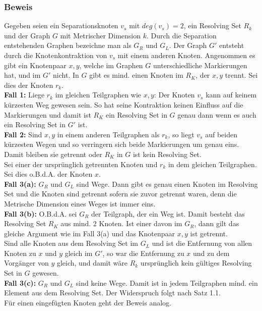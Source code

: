 \documentclass{article}
\begin{document}
\subsubsection{Beweis}
Gegeben seien ein Separationsknoten $v_s$ mit $deg(v_s)=2$, ein Resolving Set $R_k$ und der Graph $G$ mit Metrischer Dimension $k$. Durch die Separation entstehenden Graphen bezeichne man als $G_R$ und $G_L$. Der Graph $G'$ entsteht durch die Knotenkontraktion von $v_s$ mit einem anderen Knoten. Angenommen es gibt ein Knotenpaar $x,y$, welche im Graphen $G$ unterschiedliche Markierungen hat, und im $G'$ nicht. In $G$ gibt es mind. einen Knoten im $R_K$, der $x,y$ trennt. Sei dies der Knoten $r_k$.\\
\textbf{Fall 1:} Liege $r_k$ im gleichen Teilgraphen wie $x,y$: Der Knoten $v_s$ kann auf keinem kürzesten Weg gewesen sein. So hat seine Kontraktion keinen Einfluss auf die Markierungen und damit ist $R_K$ ein Resolving Set in $G$ genau dann wenn es auch ein Resolving Set in $G'$ ist.\\
\textbf{Fall 2:} Sind $x,y$ in einem anderen Teilgraphen als $r_k$, so liegt $v_s$ auf beiden kürzesten Wegen und so verringern sich beide Markierungen um genau eins. Damit bleiben sie getrennt oder $R_K$ in $G$ ist kein Resolving Set.\\
Sei einer der ursprünglich getrennten Knoten und $r_k$ in dem gleichen Teilgraphen. Sei dies o.B.d.A. der Knoten $x$.\\
\textbf{Fall 3(a):} $G_R$ und $G_L$ sind Wege. Dann gibt es genau einen Knoten im Resolving Set und die Knoten sind getrennt sofern sie zuvor getrennt waren, denn die Metrische Dimension eines Weges ist immer eins.\\
\textbf{Fall 3(b):} O.B.d.A. sei $G_R$ der Teilgraph, der ein Weg ist. Damit besteht das Resolving Set $R_K$ aus mind. 2 Knoten. Ist einer davon im $G_R$, dann gilt das gleiche Argument wie im Fall 3(a) und das Knotenpaar $x,y$ ist getrennt.\\Sind alle Knoten aus dem Resolving Set im $G_L$ und ist die Entfernung von allen Knoten zu $x$ und $y$ gleich im $G'$, so war die Entfernung zu $x$ und zu dem Vorgänger von $y$ gleich, und damit wäre $R_k$ ursprünglich kein gültiges Resolving Set in $G$ gewesen.\\
\textbf{Fall 3(c):} $G_R$ und $G_L$ sind keine Wege. Damit ist in jedem Teilgraphen mind. ein Element aus dem Resolving Set. Der Widerspruch folgt nach Satz 1.1.\\
Für einen eingefügten Knoten geht der Beweis analog.
\end{document}
